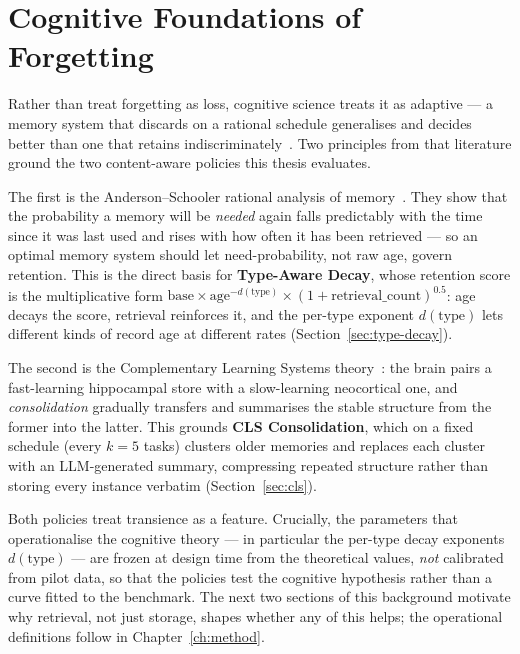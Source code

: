 

\section{Cognitive Foundations of Forgetting}

Rather than treat forgetting as loss, cognitive science treats it as adaptive --- a memory
system that discards on a rational schedule generalises and decides better than one that
retains indiscriminately~\cite{richards2017}. Two principles from that literature ground
the two content-aware policies this thesis evaluates.

The first is the Anderson--Schooler rational analysis of memory~\cite{anderson1991}. They
show that the probability a memory will be \emph{needed} again falls predictably with the
time since it was last used and rises with how often it has been retrieved --- so an
optimal memory system should let need-probability, not raw age, govern retention. This is
the direct basis for \textbf{Type-Aware Decay}, whose retention score is the multiplicative
form $\text{base} \times \text{age}^{-d(\text{type})} \times (1 + \text{retrieval\_count})^{0.5}$:
age decays the score, retrieval reinforces it, and the per-type exponent $d(\text{type})$
lets different kinds of record age at different rates
(Section~\ref{sec:type-decay}).

The second is the Complementary Learning Systems theory~\cite{mcclelland1995}: the brain
pairs a fast-learning hippocampal store with a slow-learning neocortical one, and
\emph{consolidation} gradually transfers and summarises the stable structure from the
former into the latter. This grounds \textbf{CLS Consolidation}, which on a fixed schedule
(every $k=5$ tasks) clusters older memories and replaces each cluster with an
LLM-generated summary, compressing repeated structure rather than storing every instance
verbatim (Section~\ref{sec:cls}).

Both policies treat transience as a feature. Crucially, the parameters that operationalise
the cognitive theory --- in particular the per-type decay exponents $d(\text{type})$ ---
are frozen at design time from the theoretical values, \emph{not} calibrated from pilot
data, so that the policies test the cognitive hypothesis rather than a curve fitted to the
benchmark. The next two sections of this background motivate why retrieval, not just
storage, shapes whether any of this helps; the operational definitions follow in
Chapter~\ref{ch:method}.
